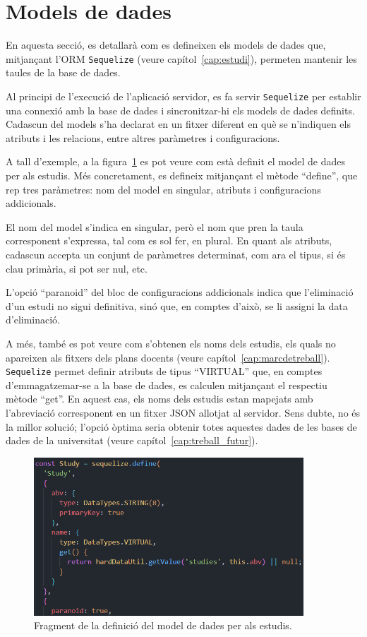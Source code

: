 \documentclass[a4paper,12pt]{ThesisStyle}
\begin{document}
\section{Models de dades}
\label{sec:models_dades}

En aquesta secció, es detallarà com es defineixen els models de dades que, mitjançant l'ORM \texttt{Sequelize} (veure capítol~\ref{cap:estudi}), permeten mantenir les taules de la base de dades.

Al principi de l'execució de l'aplicació servidor, es fa servir \texttt{Sequelize} per establir una connexió amb la base de dades i sincronitzar-hi els models de dades definits. Cadascun del models s'ha declarat en un fitxer diferent en què se n'indiquen els atributs i les relacions, entre altres paràmetres i configuracions.

A tall d'exemple, a la figura~\ref{img:modelEstudi} es pot veure com està definit el model de dades per als estudis. Més concretament, es defineix mitjançant el mètode ``define'', que rep tres paràmetres: nom del model en singular, atributs i configuracions addicionals.

El nom del model s'indica en singular, però el nom que pren la taula corresponent s'expressa, tal com es sol fer, en plural. En quant als atributs, cadascun accepta un conjunt de paràmetres determinat, com ara el tipus, si és clau primària, si pot ser nul, etc.

L'opció ``paranoid'' del bloc de configuracions addicionals indica que l'eliminació d'un estudi no sigui definitiva, sinó que, en comptes d'això, se li assigni la data d'eliminació.

A més, també es pot veure com s'obtenen els noms dels estudis, els quals no apareixen als fitxers dels plans docents (veure capítol~\ref{cap:marcdetreball}). \texttt{Sequelize} permet definir atributs de tipus ``VIRTUAL'' que, en comptes d'emmagatzemar-se a la base de dades, es calculen mitjançant el respectiu mètode ``get''. En aquest cas, els noms dels estudis estan mapejats amb l'abreviació corresponent en un fitxer JSON allotjat al servidor. Sens dubte, no és la millor solució; l'opció òptima seria obtenir totes aquestes dades de les bases de dades de la universitat (veure capítol~\ref{cap:treball_futur}).

\begin{figure}[H]
  \centering
  \includegraphics[width=0.9\textwidth]{assets/code/modelsDades/modelEstudipng.png}
  \caption{\label{img:modelEstudi} Fragment de la definició del model de dades per als estudis.}
\end{figure}
\end{document}
